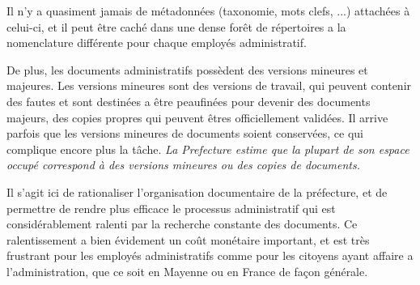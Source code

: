 Il n'y a quasiment jamais de métadonnées (taxonomie, mots clefs, ...) attachées à celui-ci, et il peut être caché dans une dense forêt de répertoires a la nomenclature différente pour chaque employés administratif.
\\
\par
De plus, les documents administratifs possèdent des versions mineures et majeures.
Les versions mineures sont des versions de travail, qui peuvent contenir des fautes et sont destinées a être peaufinées pour devenir des documents majeurs, des copies propres qui peuvent êtres officiellement validées.
Il arrive parfois que les versions mineures de documents soient conservées, ce qui complique encore plus la tâche.
\emph{La Prefecture estime que la plupart de son espace occupé correspond à des versions mineures ou des copies de documents.}
\\
\par
Il s'agit ici de rationaliser l'organisation documentaire de la préfecture, et de permettre de rendre plus efficace le processus administratif qui est considérablement ralenti par la recherche constante des documents.
Ce ralentissement a bien évidement un coût monétaire important, et est très frustrant pour les employés administratifs comme pour les citoyens ayant affaire a l'administration, que ce soit en Mayenne ou en France de façon générale. 


